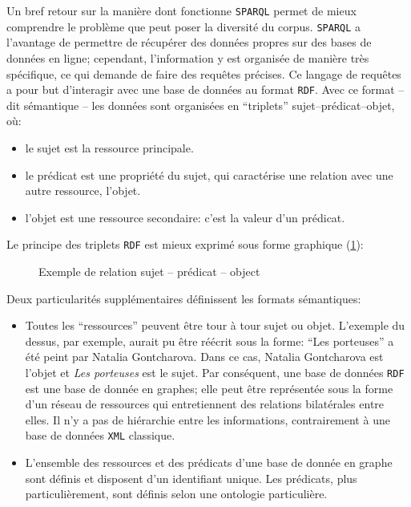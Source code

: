 \documentclass[a4paper, 12pt, twoside]{book}
\newcommand{\rdf}{\texttt{RDF}}
\newcommand{\sparql}{\texttt{\gls{SPARQL}}}
\newcommand{\xml}{\texttt{XML}}
\begin{document}
Un bref retour sur la manière dont fonctionne \sparql{} permet de mieux comprendre le problème que peut poser la diversité du corpus. \sparql{} a l'avantage de permettre de récupérer des données propres sur des bases de données en ligne; cependant, l'information y est organisée de manière très spécifique, ce qui demande de faire des requêtes précises. Ce langage de requêtes a pour but d'interagir avec une base de données au format \rdf{}. Avec ce format -- dit sémantique -- les données sont organisées en \enquote{triplets} sujet--prédicat--objet, où:

\begin{itemize}
	\item le sujet est la ressource principale.
	\item le prédicat est une propriété du sujet, qui caractérise une relation avec une autre ressource, l'objet.
	\item l'objet est une ressource secondaire: c'est la valeur d'un prédicat.
\end{itemize}

Le principe des triplets \rdf{} est mieux exprimé sous forme graphique (\ref{fig:triplet}):

\begin{figure}[!h]
	\centering
	\caption{Exemple de relation sujet -- prédicat -- object}
	\label{fig:triplet}
\end{figure}

Deux particularités supplémentaires définissent les formats sémantiques:
\begin{itemize}
	\item Toutes les \enquote{ressources} peuvent être tour à tour sujet ou objet. L'exemple du dessus, par exemple, aurait pu être réécrit sous la forme: \enquote{Les porteuses} a été peint par Natalia Gontcharova. Dans ce cas, Natalia Gontcharova est l'objet et \textit{Les porteuses} est le sujet. Par conséquent, une base de données \rdf{} est une base de donnée en graphes; elle peut être représentée sous la forme d'un réseau de ressources qui entretiennent des relations bilatérales entre elles. Il n'y a pas de hiérarchie entre les informations, contrairement à une base de données \xml{} classique.
	\item L'ensemble des ressources et des prédicats d'une base de donnée en graphe sont définis et disposent d'un identifiant unique. Les prédicats, plus particulièrement, sont définis selon une ontologie particulière.
\end{itemize}
\end{document}

